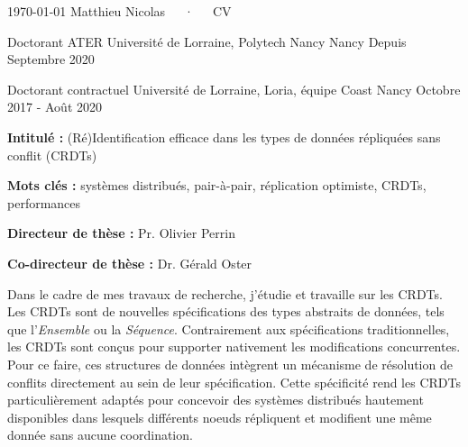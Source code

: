 \documentclass[12pt, a4paper]{awesome-cv}
\begin{document}
\makecvheader[C]

\makecvfooter
  {\today}
  {Matthieu Nicolas~~~·~~~CV}
  {\thepage}


\begin{cventries}

  \cventry
  {Doctorant ATER}
  {Université de Lorraine, Polytech Nancy}
  {Nancy}
  {Depuis Septembre 2020}
  {}

\cventry
  {Doctorant contractuel}
  {Université de Lorraine, Loria, équipe Coast}
  {Nancy}
  {Octobre 2017 - Août 2020}
  {
    \begin{cvitems} %
      \item {\textbf{Intitulé :} (Ré)Identification efficace dans les types de données répliquées sans conflit (CRDTs)}
      \item{\textbf{Mots clés :} systèmes distribués, pair-à-pair, réplication optimiste, CRDTs, performances}
      \item{\textbf{Directeur de thèse :} Pr. Olivier Perrin}
      \item{\textbf{Co-directeur de thèse :} Dr. Gérald Oster}
    \end{cvitems}
  }

\begin{cvparagraph}
  Dans le cadre de mes travaux de recherche, j'étudie et travaille sur les \acfp{CRDT}.
  Les \acp{CRDT} sont de nouvelles spécifications des types abstraits de données, tels que l'\emph{Ensemble} ou la \emph{Séquence}.
  Contrairement aux spécifications traditionnelles, les \acp{CRDT} sont conçus pour supporter nativement les modifications concurrentes.
  Pour ce faire, ces structures de données intègrent un mécanisme de résolution de conflits directement au sein de leur spécification.
  Cette spécificité rend les \acp{CRDT} particulièrement adaptés pour concevoir des systèmes distribués hautement disponibles dans lesquels différents noeuds répliquent et modifient une même donnée sans aucune coordination.


\end{cvparagraph}
\end{cventries}
\end{document}
